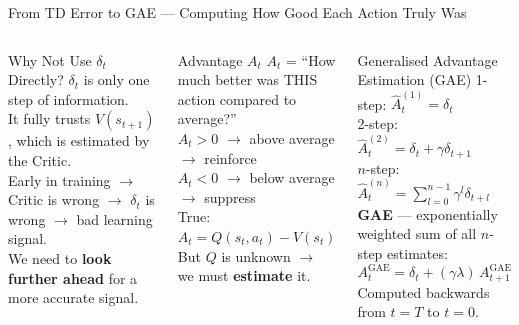 \documentclass[10pt, aspectratio=169]{beamer}
\begin{document}
\begin{frame}{From TD Error to GAE --- Computing How Good Each Action Truly Was}
\vspace{-0.2cm}
\begin{columns}[T,onlytextwidth]
\begin{alertblock}{\footnotesize Why Not Use $\delta_t$ Directly?}
  \scriptsize
  $\delta_t$ is only \alert{one step} of information.\\
  It fully trusts $V(s_{t+1})$, which is estimated by the Critic.\\[3pt]
  Early in training $\to$ Critic is wrong $\to$ $\delta_t$ is wrong $\to$ bad learning signal.\\[3pt]
  We need to \textbf{look further ahead} for a more accurate signal.
\end{alertblock}

\vspace{-0.1cm}
\begin{block}{\footnotesize Advantage $A_t$}
  \scriptsize
  $A_t$ = ``How much \alert{better} was THIS action compared to average?''\\[3pt]
  $A_t > 0$ $\to$ above average $\to$ reinforce\\
  $A_t < 0$ $\to$ below average $\to$ suppress\\[3pt]
  True: $A_t = Q(s_t, a_t) - V(s_t)$\\
  But $Q$ is unknown $\to$ we must \textbf{estimate} it.
\end{block}

\begin{exampleblock}{\footnotesize Generalised Advantage Estimation (GAE)}
  \scriptsize
  1-step: $\hat{A}_t^{(1)} = \delta_t$\\[2pt]
  2-step: $\hat{A}_t^{(2)} = \delta_t + \gamma\delta_{t+1}$\\[2pt]
  $n$-step: $\hat{A}_t^{(n)} = \sum_{l=0}^{n-1} \gamma^l \delta_{t+l}$\\[6pt]
  \textbf{GAE} --- exponentially weighted sum of all $n$-step estimates:
  \[
    \boxed{A_t^{\text{GAE}} = \delta_t + (\gamma\lambda)\,A_{t+1}^{\text{GAE}}}
  \]
  Computed \alert{backwards} from $t=T$ to $t=0$.
\end{exampleblock}
\end{columns}


\end{frame}
\end{document}
